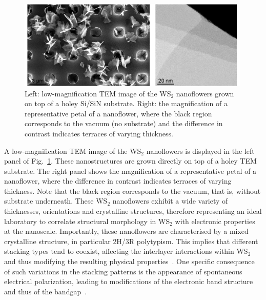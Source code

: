 \begin{figure}[t]
    \centering
    \includegraphics[width=0.99\textwidth]{plots/TEMwE-full-figure-withscales-centred-1.pdf}
    \caption{Left: low-magnification TEM image of the WS$_2$ nanoflowers
      grown on top of a holey Si/SiN substrate.
      Right: the magnification of a
      representative petal
      of a nanoflower, where the black region corresponds to the vacuum (no substrate)
      and the difference in contrast indicates terraces of varying thickness.
       }
    \label{fig:nanoflowers}
\end{figure}

A low-magnification TEM image of the WS$_2$ nanoflowers is displayed
in the left panel of Fig.~\ref{fig:nanoflowers}.
%
These nanostructures are grown directly on top of a holey TEM substrate.
%
The right panel shows the magnification of a
representative petal
of a nanoflower, where
the difference in contrast indicates terraces of varying thickness.
%
Note that the black region corresponds to the vacuum, that is, without
substrate underneath.
%
These WS$_2$ nanoflowers exhibit a wide variety of thicknesses, orientations
and crystalline structures, therefore representing an ideal laboratory to correlate
structural morphology in WS$_2$ with electronic properties at the nanoscale.
%
Importantly, these nanoflowers are characterised by a mixed crystalline structure,
in particular 2H/3R polytypism.
%
This implies that different stacking types tend to coexist,  affecting
the interlayer interactions within WS$_2$
and thus modifying the resulting physical properties~\cite{Na:2018}.
%
One specific consequence of such variations in the stacking patterns is the appearance of
spontaneous electrical polarization, leading to modifications of the 
electronic band structure and thus of the bandgap~\cite{Lee:2016,XIA20171}.



